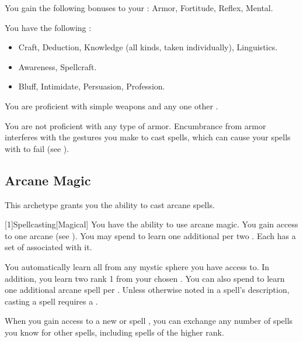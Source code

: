         You gain the following bonuses to your :  Armor,  Fortitude,  Reflex,  Mental.

        You have the following :
        \begin{itemize}
            \item {} Craft, Deduction, Knowledge (all kinds, taken individually), Linguistics.
            \item {} Awareness, Spellcraft.
            \item {} Bluff, Intimidate, Persuasion, Profession.
        \end{itemize}

        You are proficient with simple weapons and any one other .

        You are not proficient with any type of armor.
        Encumbrance from armor interferes with the gestures you make to cast spells, which can cause your spells with  to fail (see ).

    \subsection{Arcane Magic}
        This archetype grants you the ability to cast arcane spells.

        [1]{Spellcasting}[Magical]
        You have the ability to use arcane magic.
        You gain access to one arcane  (see ).
        You may spend  to learn one additional  per two .
        Each  has a set of  associated with it.

        You automatically learn all  from any mystic sphere you have access to.
        In addition, you learn two rank 1  from your chosen .
        You can also spend  to learn one additional arcane spell per .
        Unless otherwise noted in a spell's description, casting a spell requires a .

        When you gain access to a new  or spell ,
            you can exchange any number of spells you know for other spells,
            including spells of the higher rank.

